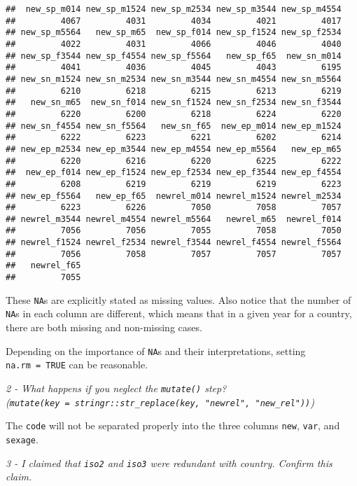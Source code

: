\documentclass[]{article}
\theoremstyle{definition}
\theoremstyle{definition}
\theoremstyle{definition}
\theoremstyle{remark}
\begin{document}
\begin{verbatim}
##  new_sp_m014 new_sp_m1524 new_sp_m2534 new_sp_m3544 new_sp_m4554 
##         4067         4031         4034         4021         4017 
## new_sp_m5564   new_sp_m65  new_sp_f014 new_sp_f1524 new_sp_f2534 
##         4022         4031         4066         4046         4040 
## new_sp_f3544 new_sp_f4554 new_sp_f5564   new_sp_f65  new_sn_m014 
##         4041         4036         4045         4043         6195 
## new_sn_m1524 new_sn_m2534 new_sn_m3544 new_sn_m4554 new_sn_m5564 
##         6210         6218         6215         6213         6219 
##   new_sn_m65  new_sn_f014 new_sn_f1524 new_sn_f2534 new_sn_f3544 
##         6220         6200         6218         6224         6220 
## new_sn_f4554 new_sn_f5564   new_sn_f65  new_ep_m014 new_ep_m1524 
##         6222         6223         6221         6202         6214 
## new_ep_m2534 new_ep_m3544 new_ep_m4554 new_ep_m5564   new_ep_m65 
##         6220         6216         6220         6225         6222 
##  new_ep_f014 new_ep_f1524 new_ep_f2534 new_ep_f3544 new_ep_f4554 
##         6208         6219         6219         6219         6223 
## new_ep_f5564   new_ep_f65  newrel_m014 newrel_m1524 newrel_m2534 
##         6223         6226         7050         7058         7057 
## newrel_m3544 newrel_m4554 newrel_m5564   newrel_m65  newrel_f014 
##         7056         7056         7055         7058         7050 
## newrel_f1524 newrel_f2534 newrel_f3544 newrel_f4554 newrel_f5564 
##         7056         7058         7057         7057         7057 
##   newrel_f65 
##         7055
\end{verbatim}

These \texttt{NA}s are explicitly stated as missing values. Also notice
that the number of \texttt{NA}s in each column are different, which
means that in a given year for a country, there are both missing and
non-missing cases.

Depending on the importance of \texttt{NA}s and their interpretations,
setting \texttt{na.rm\ =\ TRUE} can be reasonable.

\emph{2 - What happens if you neglect the \texttt{mutate()} step?
(\texttt{mutate(key\ =\ stringr::str\_replace(key,\ "newrel",\ "new\_rel"))})}

The \texttt{code} will not be separated properly into the three columns
\texttt{new}, \texttt{var}, and \texttt{sexage}.

\emph{3 - I claimed that \texttt{iso2} and \texttt{iso3} were redundant
with country. Confirm this claim.}
\end{document}

